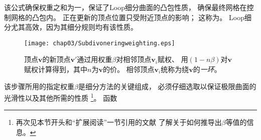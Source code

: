 该公式确保权重之和为一，保证了Loop细分曲面的凸包性质，
确保最终网格在控制网格的凸包内。
正在更新的顶点位置只受附近顶点的影响；
这称为。
Loop细分尤其高效，因为其细分规则均有该性质。
\begin{figure}[htbp]
    \centering\texttt{[image: chap03/Subdivoneringweighting.eps]}
    \caption{顶点$\bm v$的新顶点$\bm v'$通过用权重$\beta$对相邻顶点$\bm v_i$赋权、
        用$(1-n\beta)$对$\bm v$赋权计算得到，其中$n$为$\bm v$的价。
        相邻顶点$\bm v_i$统称为绕$\bm v$的\emph{一环}。}
    \label{fig:3.33}
\end{figure}

该步骤所用的指定权重$\beta$是细分方法的关键组成，
必须仔细选取以保证极限曲面的光滑性以及其他所需的性质
\footnote{再次见本节开头和“扩展阅读”一节引用的文献
    了解关于如何推导出$\beta$等值的信息。}。
函数